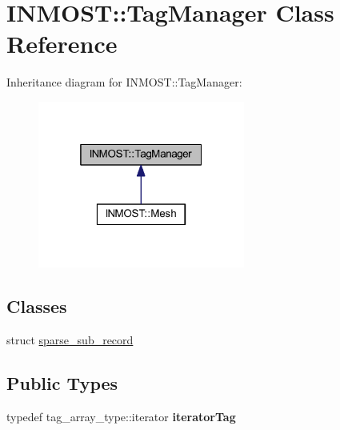 \hypertarget{classINMOST_1_1TagManager}{\section{I\-N\-M\-O\-S\-T\-:\-:Tag\-Manager Class Reference}
\label{classINMOST_1_1TagManager}
}


Inheritance diagram for I\-N\-M\-O\-S\-T\-:\-:Tag\-Manager\-:\nopagebreak
\begin{figure}[H]
\begin{center}
\leavevmode
\includegraphics[width=193pt]{classINMOST_1_1TagManager__inherit__graph}
\end{center}
\end{figure}
\subsection*{Classes}
\begin{DoxyCompactItemize}
\item 
struct \hyperlink{structINMOST_1_1TagManager_1_1sparse__sub__record}{sparse\-\_\-sub\-\_\-record}
\end{DoxyCompactItemize}
\subsection*{Public Types}
\begin{DoxyCompactItemize}
\item 
\hypertarget{classINMOST_1_1TagManager_adda9f59b50509dee56fa03697e1b4b02}{typedef tag\-\_\-array\-\_\-type\-::iterator {\bfseries iterator\-Tag}}\label{classINMOST_1_1TagManager_adda9f59b50509dee56fa03697e1b4b02}

\end{DoxyCompactItemize}
